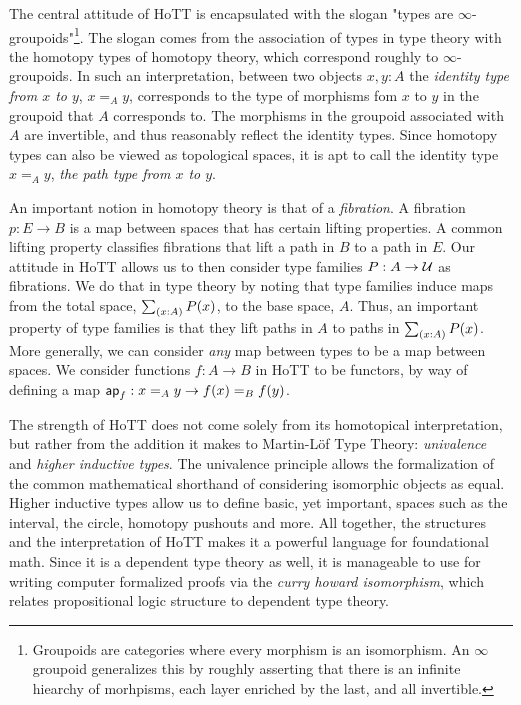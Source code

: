 \documentclass[main.tex]{subfiles}
\begin{document}
The central attitude of HoTT is encapsulated with the slogan "types are $\infty$-groupoids"\footnote{Groupoids are categories where every morphism is an isomorphism. An $\infty$ groupoid generalizes this by roughly asserting that there is an infinite hiearchy of morhpisms, each layer enriched by the last, and all invertible.}\cite{berg_garner_richard}. The slogan comes from the association of types in type theory with the homotopy types of homotopy theory, which correspond roughly to $\infty$-groupoids. In such an  interpretation, between two objects $x,y : A$ the \textit{identity type from $x$ to $y$}, $x=_Ay$, corresponds to the type of morphisms fom $x$ to $y$ in the groupoid that $A$ corresponds to. The morphisms in the groupoid associated with $A$ are invertible, and thus reasonably reflect the identity types. Since homotopy types can also be viewed as topological spaces, it is apt to call the identity type $x=_Ay$, \textit{the path type from $x$ to $y$}.

An important notion in homotopy theory is that of a \textit{fibration}. A fibration $p : E \to B$ is a map between spaces that has certain lifting properties. A common lifting property classifies fibrations that lift a path in $B$ to a path in $E$. Our attitude in HoTT allows us to then consider type families $P : A \to \mathcal{U}$ as fibrations. We do that in type theory by noting that type families induce maps from the total space, $\sm{x:A}P(x)$, to the base space, $A$. Thus, an important property of type families is that they lift paths in $A$ to paths in $\sm{x:A}P(x)$. More generally, we can consider \textit{any} map between types to be a map between spaces. We consider functions $f:A \to B$ in HoTT to be functors, by way of defining a map $\mathsf{ap}_{f} : x=_A y \to f(x)=_B f(y)$. 

The strength of HoTT does not come solely from its homotopical interpretation, but rather from the addition it makes to Martin-L\"of Type Theory: \textit{univalence} and \textit{higher inductive types}. The univalence principle allows the formalization of the common mathematical shorthand of considering isomorphic objects as equal. Higher inductive types allow us to define basic, yet important, spaces such as the interval, the circle, homotopy pushouts and more. All together, the structures and the interpretation of HoTT makes it a powerful language for foundational math. Since it is a dependent type theory as well, it is manageable to use for writing computer formalized proofs via the \textit{curry howard isomorphism}, which relates propositional logic structure to dependent type theory.
\end{document}
